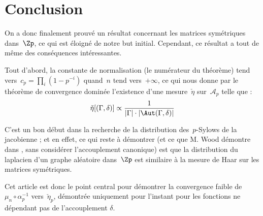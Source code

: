 \newpage
\section*{Conclusion}
On a donc finalement prouv\'e un r\'esultat concernant les matrices sym\'etriques dans~$\Zp$, ce qui est \'eloign\'e de notre but initial. Cependant, ce r\'esultat a tout de m\^eme des cons\'equences int\'eressantes.

Tout d'abord, la constante de normalisation (le num\'erateur du th\'eor\`eme) tend vers~$c_{p} = \prod_{i}{(1-p^{-i})}$ quand~$n$ tend vers~$+\infty$, ce qui nous donne par le th\'eor\`eme de convergence domin\'ee l'existence d'une mesure~$\check \eta$ sur~$\mathcal A_{p}$ telle que :
\[ \check \eta[(\Gamma, \delta)] \propto \frac1{|\Gamma|\cdot|\Aut(\Gamma,\delta)|} \]

C'est un bon d\'ebut dans la recherche de la distribution des~$p$-Sylows de la jacobienne ; et en effet, ce qui reste \`a d\'emontrer (et ce que M. Wood d\'emontre dans \cite{main}, sans consid\'erer l'accouplement canonique) est que la distribution du laplacien d'un graphe al\'eatoire dans~$\Zp$ est similaire \`a la mesure de Haar sur les matrices sym\'etriques.

Cet article est donc le point central pour d\'emontrer la convergence faible de~$\mu_{n}\circ\alpha_{p}^{-1}$ vers~$\check \eta_{p}$, d\'emontr\'ee uniquement pour l'instant pour les fonctions ne d\'ependant pas de l'accouplement $\delta$.
